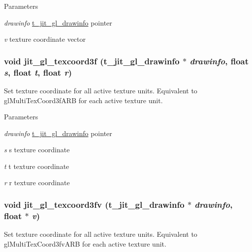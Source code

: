\begin{DoxyParams}{Parameters}
\item[{\em drawinfo}]\hyperlink{structt__jit__gl__drawinfo}{t\_\-jit\_\-gl\_\-drawinfo} pointer \item[{\em v}]texture coordinate vector \end{DoxyParams}
\hypertarget{group__ob3dmod_gaab1f76591dd2a0f9fd54d0634772a561}{
\subsubsection[{jit\_\-gl\_\-texcoord3f}]{\setlength{\rightskip}{0pt plus 5cm}void jit\_\-gl\_\-texcoord3f ({\bf t\_\-jit\_\-gl\_\-drawinfo} $\ast$ {\em drawinfo}, \/  float {\em s}, \/  float {\em t}, \/  float {\em r})}}
\label{group__ob3dmod_gaab1f76591dd2a0f9fd54d0634772a561}


Set texture coordinate for all active texture units. Equivalent to glMultiTexCoord3fARB for each active texture unit.


\begin{DoxyParams}{Parameters}
\item[{\em drawinfo}]\hyperlink{structt__jit__gl__drawinfo}{t\_\-jit\_\-gl\_\-drawinfo} pointer \item[{\em s}]s texture coordinate \item[{\em t}]t texture coordinate \item[{\em r}]r texture coordinate \end{DoxyParams}
\hypertarget{group__ob3dmod_gad517647e1bd68e6c1ddb6907877897c0}{
\subsubsection[{jit\_\-gl\_\-texcoord3fv}]{\setlength{\rightskip}{0pt plus 5cm}void jit\_\-gl\_\-texcoord3fv ({\bf t\_\-jit\_\-gl\_\-drawinfo} $\ast$ {\em drawinfo}, \/  float $\ast$ {\em v})}}
\label{group__ob3dmod_gad517647e1bd68e6c1ddb6907877897c0}


Set texture coordinate for all active texture units. Equivalent to glMultiTexCoord3fvARB for each active texture unit.


